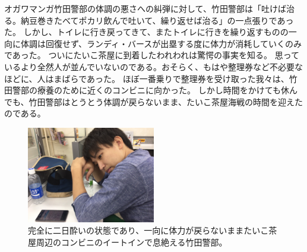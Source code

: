 オガワマンガ竹田警部の体調の悪さへの糾弾に対して、竹田警部は「吐けば治る。納豆巻きたべてポカリ飲んで吐いて、繰り返せば治る」の一点張りであった。
しかし、トイレに行き戻ってきて、またトイレに行きを繰り返すものの一向に体調は回復せず、ランディ・バースが出塁する度に体力が消耗していくのみであった。
ついにたいこ茶屋に到着したわれわれは驚愕の事実を知る。
思っているより全然人が並んでいないのである。おそらく、もはや整理券など不必要なほどに、人はまばらであった。
ほぼ一番乗りで整理券を受け取った我々は、竹田警部の療養のために近くのコンビニに向かった。
しかし時間をかけても休んでも、竹田警部はとうとう体調が戻らないまま、たいこ茶屋海戦の時間を迎えたのである。

\begin{figure}[htbp]
  \begin{center}
    \includegraphics[width=0.5\textwidth]{./section/sasakiLIVE/figures/PoHutsuka.jpg}
  \end{center}
  \caption{完全に二日酔いの状態であり、一向に体力が戻らないままたいこ茶屋周辺のコンビニのイートインで息絶える竹田警部。}
  \label{fig:Jalert}
\end{figure}



